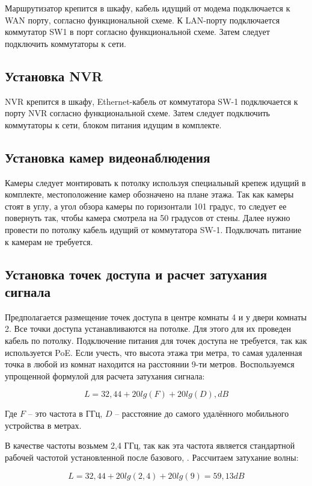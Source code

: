 Маршрутизатор крепится в шкафу, кабель идущий от модема подключается к WAN порту, согласно функциональной схеме.
К LAN-порту подключается коммутатор SW1 в порт согласно функциональной схеме. Затем следует подключить коммутаторы к сети.

\subsection{Установка NVR}

NVR крепится в шкафу, Ethernet-кабель от коммутатора SW-1 подключается к порту NVR согласно функциональной схеме.
Затем следует подключить коммутаторы к сети, блоком питания идущим в комплекте.

\subsection{Установка камер видеонаблюдения}

Камеры следует монтировать к потолку используя специальный крепеж идущий в комплекте, местоположение камер
обозначено на плане этажа. Так как камеры стоят в углу, а угол обзора камеры по горизонтали 101 градус, то следует ее повернуть так,
чтобы камера смотрела на 50 градусов от стены. Далее 
нужно провести по потолку кабель идущий от коммутатора SW-1. Подключать питание к камерам не требуется.

\subsection{Установка точек доступа и расчет затухания сигнала}

Предполагается размещение точек доступа в центре комнаты 4 и у двери комнаты 2. Все точки доступа устанавливаются на потолке.
Для этого для их проведен кабель по потолку. Подключение питания для точек доступа не требуется, так как используется PoE.
Если учесть, что высота этажа три метра, то самая удаленная точка в любой из комнат находится на расстоянии 9-ти метров. 
Воспользуемся упрощенной формулой для расчета затухания сигнала:

\[L = 32,44 + 20lg(F) + 20lg(D), dB\]

Где \(F\) – это частота в ГГц, \(D\) – расстояние до самого удалённого мобильного устройства в метрах.

В качестве частоты возьмем 2,4 ГГц, так как эта частота является стандартной рабочей частотой установленной после базового,
. 
Рассчитаем затухание волны:

\[L = 32,44 + 20lg(2,4) + 20lg(9) = 59,13 dB\]

